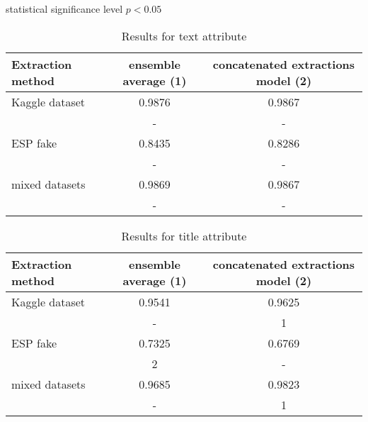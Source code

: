 \documentclass{article}
\begin{document}
statistical significance level $ p < 0.05 $

\begin{table}[]
  \centering
  \caption{Results for text attribute}

  \begin{tabular}{|l|c|c|}
  \hline
  Extraction method & ensemble average (1) & concatenated extractions model (2)\\
  \hline
  Kaggle dataset     & 0.9876         & 0.9867  \\
                & \small{-}     & \small{-}    \\
  \hline
  ESP fake      &  0.8435        & 0.8286        \\
                & \small{-}     & \small{-}    \\
  \hline
  mixed datasets & 0.9869         & 0.9867       \\
                & \small{-}   & \small{-}      \\
  \hline

\end{tabular}
  \label{tab:results_text}
\end{table}

\begin{table}[]
  \centering
  \caption{Results for title attribute}

  \begin{tabular}{|l|c|c|}
  \hline
  Extraction method & ensemble average (1) & concatenated extractions model (2)\\
  \hline
  Kaggle dataset     & 0.9541         & 0.9625  \\
                & \small{-}     & \small{1}    \\
  \hline
  ESP fake      &  0.7325        & 0.6769        \\
                & \small{2}     & \small{-}    \\
  \hline
  mixed datasets & 0.9685         & 0.9823       \\
                & \small{-}   & \small{1}      \\
  \hline

\end{tabular}
  \label{tab:results_title}
\end{table}
\end{document}
